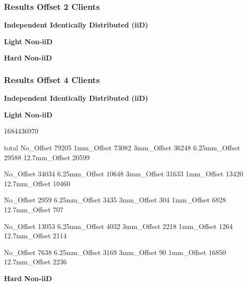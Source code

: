 \documentclass[9pt]{beamer}
\begin{document}
\begin{frame}
\frametitle{Results Offset 2 Clients}

\textbf{Independent Identically Distributed (iiD) }

\textbf{Light Non-iiD}

\textbf{Hard Non-iiD}







\end{frame}




\begin{frame}
\frametitle{Results Offset 4 Clients}


\textbf{Independent Identically Distributed (iiD) }

\textbf{Light Non-iiD}

1684436970


total No_Offset  79205
1mm_Offset       73082
3mm_Offset       36248
6.25mm_Offset    29588
12.7mm_Offset    20599



No_Offset        34034
6.25mm_Offset    10648
3mm_Offset       31633
1mm_Offset       13420
12.7mm_Offset    10460

No_Offset        2959
6.25mm_Offset    3435
3mm_Offset        304
1mm_Offset       6828
12.7mm_Offset     707

No_Offset        13053
6.25mm_Offset     4032
3mm_Offset        2218
1mm_Offset        1264
12.7mm_Offset     2114

No_Offset         7638
6.25mm_Offset     3169
3mm_Offset          90
1mm_Offset       16850
12.7mm_Offset     2236




\textbf{Hard Non-iiD}








\end{frame}
\end{document}
